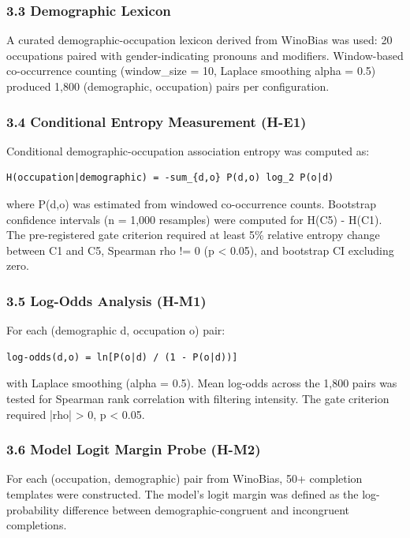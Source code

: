 \subsubsection{3.3 Demographic Lexicon}

A curated demographic-occupation lexicon derived from WinoBias \citep{Zhao2018WinoBias} was used: 20 occupations paired with gender-indicating pronouns and modifiers. Window-based co-occurrence counting (window\_size = 10, Laplace smoothing alpha = 0.5) produced 1,800 (demographic, occupation) pairs per configuration.

\subsubsection{3.4 Conditional Entropy Measurement (H-E1)}

Conditional demographic-occupation association entropy was computed as:

\begin{verbatim}
H(occupation|demographic) = -sum_{d,o} P(d,o) log_2 P(o|d)
\end{verbatim}

where P(d,o) was estimated from windowed co-occurrence counts. Bootstrap confidence intervals (n = 1,000 resamples) were computed for H(C5) - H(C1). The pre-registered gate criterion required at least 5\% relative entropy change between C1 and C5, Spearman rho != 0 (p < 0.05), and bootstrap CI excluding zero.

\subsubsection{3.5 Log-Odds Analysis (H-M1)}

For each (demographic d, occupation o) pair:

\begin{verbatim}
log-odds(d,o) = ln[P(o|d) / (1 - P(o|d))]
\end{verbatim}

with Laplace smoothing (alpha = 0.5). Mean log-odds across the 1,800 pairs was tested for Spearman rank correlation with filtering intensity. The gate criterion required |rho| > 0, p < 0.05.

\subsubsection{3.6 Model Logit Margin Probe (H-M2)}

For each (occupation, demographic) pair from WinoBias, 50+ completion templates were constructed. The model's logit margin was defined as the log-probability difference between demographic-congruent and incongruent completions.

